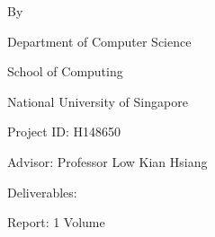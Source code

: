 \begin{titlepage}
    {\centering
    {\large \projecttype}
    \vfill
    {\LARGE\bfseries \projecttitle\par}
    \vspace{2cm}
    {\large By\par \authorname}
    \vfill
    {\normalsize Department of Computer Science\par
    School of Computing\par
    National University of Singapore\par}
    \vspace{1cm}
    {\normalsize \academicyear\par}
    }
    \vspace{1cm}
    Project ID: H148650 \par
    Advisor: Professor Low Kian Hsiang \par
    \vspace{1cm}
    Deliverables: \par
    \begin{list}{\quad}{}
        \item Report: 1 Volume
    \end{list}
\end{titlepage}
\restoregeometry
\pagebreak
